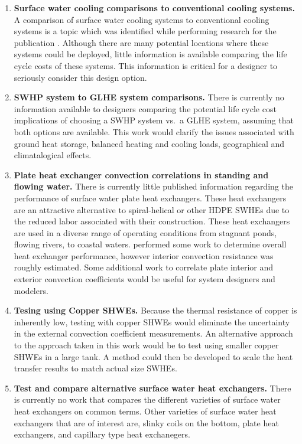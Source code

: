 \begin{enumerate}

	\item \textbf{Surface water cooling comparisons to conventional cooling systems.} A comparison of surface water cooling systems to conventional cooling systems is a topic which was identified while performing research for the publication \cite{MitchellSpitler2013}. Although there are many potential locations where these systems could be deployed, little information is available comparing the life cycle costs of these systems. This information is critical for a designer to seriously consider this design option.
	
	\item \textbf{SWHP system to GLHE system comparisons.} There is currently no information available to designers comparing the potential life cycle cost implications of choosing a SWHP system vs.\ a GLHE system, assuming that both options are available. This work would clarify the issues associated with ground heat storage, balanced heating and cooling loads, geographical and climatalogical effects.
	
	\item \textbf{Plate heat exchanger convection correlations in standing and flowing water.} There is currently little published information regarding the performance of surface water plate heat exchangers. These heat exchangers are an attractive alternative to spiral-helical or other HDPE SWHEs due to the reduced labor associated with their construction. These heat exchangers are used in a diverse range of operating conditions from stagnant ponds, flowing rivers, to coastal waters. \cite{Hansen2011} performed some work to determine overall heat exchanger performance, however interior convection resistance was roughly estimated. Some additional work to correlate plate interior and exterior convection coefficients would be useful for system designers and modelers.
	
	\item \textbf{Tesing using Copper SHWEs.} Because the thermal resistance of copper is inherently low, testing with copper SHWEs would eliminate the uncertainty in the external convection coefficient measurements. An alternative approach to the approach taken in this work would be to test using smaller copper SHWEs in a large tank. A method could then be developed to scale the heat transfer results to match actual size SWHEs.
	
	\item \textbf{Test and compare alternative surface water heat exchangers.} There is currently no work that compares the different varieties of surface water heat exchangers on common terms. Other varieties of surface water heat exchangers that are of interest are, slinky coils on the bottom, plate heat exchangers, and capillary type heat exchanegers.
	
\end{enumerate}
